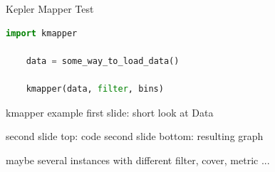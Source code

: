 \documentclass{beamer}
\begin{document}
\begin{frame}[fragile]{Kepler Mapper}
Test
\begin{lstlisting}[backgroundcolor = \color{bg!90!fg},
                   language = python,
                   xleftmargin = 1cm,
									]
	import kmapper
	
	data = some_way_to_load_data()
	
	kmapper(data, filter, bins)
\end{lstlisting}
\end{frame}


\begin{frame}{kmapper example}
first slide:
short look at Data

second slide top: code
second slide bottom: resulting graph

maybe several instances with different filter, cover, metric ...



\end{frame}
\end{document}
